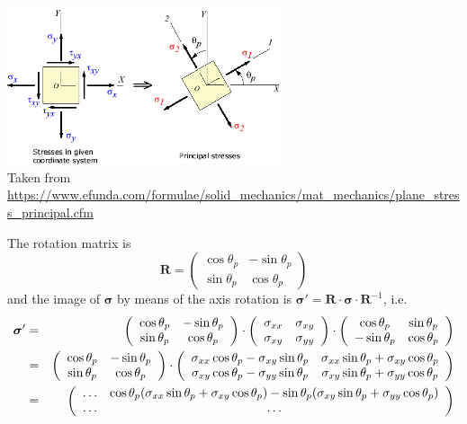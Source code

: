\begin{center}
\includegraphics[width=8cm]{images/princ_stress/PrincipalStress}\\
{\scriptsize Taken from \url{https://www.efunda.com/formulae/solid_mechanics/mat_mechanics/plane_stress_principal.cfm}}
\end{center}
 
The rotation matrix is 
\[
{\bm R}=
\left(
\begin{array}{cc}
\cos\theta_p & -\sin\theta_p \\
\sin\theta_p & \cos\theta_p
\end{array}
\right)
\]
and the image of ${\bm \sigma}$ by means of the axis rotation is 
${\bm \sigma}'= {\bm R}\cdot {\bm \sigma}\cdot {\bm R}^{-1}$, i.e.
\begin{eqnarray}
{\bm \sigma}' 
&=&
\left(
\begin{array}{cc}
\cos\theta_p & -\sin\theta_p \\
\sin\theta_p & \cos\theta_p
\end{array}
\right)
\cdot
\left(
\begin{array}{cc}
\sigma_{xx} & \sigma_{xy} \\
\sigma_{xy} & \sigma_{yy} 
\end{array}
\right)
\cdot
\left(
\begin{array}{cc}
\cos\theta_p & \sin\theta_p \\
-\sin\theta_p & \cos\theta_p
\end{array}
\right) \nonumber\\
&=&\left(
\begin{array}{cc}
\cos\theta_p & -\sin\theta_p \\
\sin\theta_p & \cos\theta_p
\end{array}
\right)
\cdot
\left(
\begin{array}{cc}
\sigma_{xx} \cos\theta_p - \sigma_{xy} \sin\theta_p  &
\sigma_{xx} \sin\theta_p + \sigma_{xy} \cos\theta_p  \\
\sigma_{xy} \cos\theta_p - \sigma_{yy} \sin\theta_p & 
\sigma_{xy} \sin\theta_p + \sigma_{yy} \cos\theta_p 
\end{array}
\right) \nonumber\\
&=&
\left(
\begin{array}{cc}
\dots & 
\cos\theta_p(\sigma_{xx} \sin\theta_p + \sigma_{xy} \cos\theta_p )-
\sin\theta_p(\sigma_{xy} \sin\theta_p + \sigma_{yy} \cos\theta_p ) \\
\dots & \dots 
\end{array}
\right) \nonumber 
\end{eqnarray}
